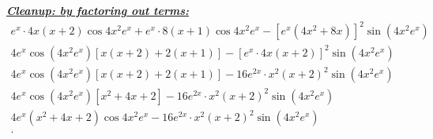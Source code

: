 \documentclass{report}
\begin{document}
  \bigbreak \noindent \bigbreak \noindent 
  \textbf{\textit{\underline{Cleanup: by factoring out terms:}}}
  \begin{align*}
    e^{x}\cdot 4x(x+2)\cos{4x^{2}e^{x}}+e^{x}\cdot 8(x+1)\cos{4x^{2}e^{x}}-[e^{x}(4x^{2}+8x)]^2\sin{(4x^{2}e^{x})} \\
    4e^{x}\cos{(4x^{2}e^{x})}[x(x+2) + 2(x+1)] - [e^{x}\cdot 4x(x+2)]^2\sin{(4x^{2}e^{x})} \\
    4e^{x}\cos{(4x^{2}e^{x})}[x(x+2) + 2(x+1)] - 16e^{2x}\cdot x^2(x+2)^2\sin{(4x^{2}e^{x})} \\
    4e^{x}\cos{(4x^{2}e^{x})}[x^{2}+4x+2] - 16e^{2x}\cdot x^2(x+2)^2\sin{(4x^{2}e^{x})} \\
    4e^{x}(x^{2}+4x+2)\cos{4x^{2}e^{x}}- 16e^{2x}\cdot x^2(x+2)^2\sin{(4x^{2}e^{x})} \\
  .\end{align*}
\end{document}
